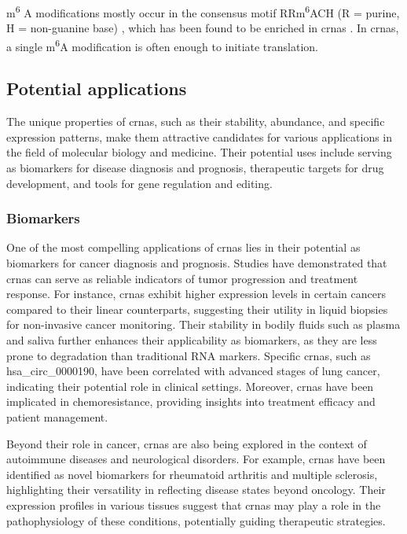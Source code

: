 m\textsuperscript{6}
A modifications mostly occur in the consensus motif RRm\textsuperscript{6}ACH
(R = purine, H = non-guanine base)
\supercite{csepany_sequence_1990,harper_sequence_1990}, which has been found to
be enriched in \gls{crna}s \supercite{yang_extensive_2017}.
In \gls{crna}s, a single m\textsuperscript{6}A modification is often enough to
initiate translation\supercite{yang_extensive_2017}.

\subsection{Potential applications}
\label{sec:circrna_applications}
The unique properties of \gls{crna}s, such as their stability, abundance, and
specific expression patterns, make them attractive candidates for various
applications in the field of molecular biology and medicine.
Their potential uses include serving as biomarkers for disease diagnosis and
prognosis, therapeutic targets for drug development, and tools for gene
regulation and editing.

\subsubsection{Biomarkers}
One of the most compelling applications of \gls{crna}s lies in their potential
as biomarkers for cancer diagnosis and prognosis.
Studies have demonstrated that \gls{crna}s can serve as reliable indicators of
tumor progression and treatment response.
For instance, \gls{crna}s exhibit higher expression levels in certain cancers
compared to their linear counterparts, suggesting their utility in liquid
biopsies for non-invasive cancer
monitoring\supercite{bao_prognostic_2020,ren_construction_2017}.
Their stability in bodily fluids such as plasma and saliva further enhances
their applicability as biomarkers, as they are less prone to degradation than
traditional RNA markers\supercite{bao_prognostic_2020,zhang_circular_2018}.
Specific \gls{crna}s, such as hsa\_circ\_0000190, have been correlated with
advanced stages of lung cancer, indicating their potential role in clinical
settings\supercite{luo_plasma_2020}.
Moreover, \gls{crna}s have been implicated in chemoresistance, providing
insights into treatment efficacy and patient
management\supercite{geng_function_2018,feng_functions_2019}.

Beyond their role in cancer, \gls{crna}s are also being explored in the context
of autoimmune diseases and neurological disorders.
For example, \gls{crna}s have been identified as novel biomarkers for
rheumatoid arthritis and multiple sclerosis, highlighting their versatility in
reflecting disease states beyond
oncology\supercite{ouyang_identification_2021,he_exosomal_2019}.
Their expression profiles in various tissues suggest that \gls{crna}s may play
a role in the pathophysiology of these conditions, potentially guiding
therapeutic strategies\supercite{mohammed_circular_2023}.

